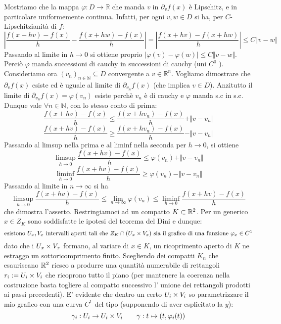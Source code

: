  Mostriamo che la mappa $\varphi: D \rightarrow \mathbb{R}$ che manda $v$ in $\partial_v f(x)$ è Lipschitz, e in particolare uniformemente continua. Infatti, per ogni $v,w \in D$ si ha, per $C$-Lipschitzianità di $f$:
$$  \left \vert \frac{ f(x+hv) - f(x) }{h} - \frac{ f(x+hw) - f(x) }{h} \right  \vert = \left \vert \frac{ f(x+hv) - f(x+hw)}{h} \right \vert \le C \Vert v-w \Vert $$ 
Passando al limite in $h \to 0 $ si ottiene proprio $\vert \varphi(v) - \varphi(w) \vert \le C \Vert v-w \Vert$. Perciò $\varphi$ manda successioni di cauchy in successioni di cauchy (uni $C^0$ ). \newline
Consideriamo ora $(v_n)_{n \in \mathbb{N} } \subseteq D$ convergente a $v \in \mathbb{R}^n$. Vogliamo dimostrare che $\partial_v f (x)$ esiste ed è uguale al limite di $\partial_{v_n} f (x) $ (che implica $v \in D$). Anzitutto il limite di $\partial_{v_n} f(x) = \varphi(v_n) $ esiste perchè $v_n$ è di cauchy e $\varphi$ manda s.c in s.c. Dunque vale $\forall n \in \mathbb{N}$, con lo stesso conto di prima:
$$ \frac{f(x+hv) - f(x) }{h}    \le \frac{ f(x+hv_n) - f(x) }{h} + \Vert v-v_n \Vert $$
$$ \frac{f(x+hv) - f(x)}{h} \ge \frac{ f(x+hv_n) - f(x) }{h} - \Vert v-v_n \Vert $$
Passando al limsup nella prima e al liminf nella seconda per $h \to 0$, si ottiene
$$\limsup_{h \to 0} \frac{f(x+hv) - f(x)}{h} \le \varphi(v_n) + \Vert v- v_n \Vert $$
$$ \liminf_{h \to 0} \frac{f(x+hv) - f(x)}{h} \ge \varphi(v_n) - \Vert v-v_n \Vert $$
Passando al limite in $n \to \infty$ si ha
$$ \limsup_{h \to 0} \frac{f(x+hv) - f(x)}{h} \le \lim_{n \to \infty} \varphi(v_n) \le \liminf_{h \to 0} \frac{f(x+hv) - f(x)}{h} $$
che dimostra l'asserto. 
 Restringiamoci ad un compatto $K\subset \mathbb{R}^2$. Per un generico $x\in Z_K$ sono soddisfatte le ipotesi del teorema del Dini e dunque:
$$
\mbox{esistono } U_x,V_x\mbox{ intervalli aperti tali che } Z_K\cap (U_x \times V_x) \mbox{ sia il grafico di una funzione $\varphi_x \in C^1$}
$$
dato che i $U_x \times V_x$ formano, al variare di $x\in K$, un ricoprimento aperto di $K$ ne estraggo un sottoricomprimento finito. Scegliendo dei compatti $K_n$ che esauriscano $\mathbb{R}^2$ riesco a produrre una quantità numerabile di rettangoli $r_i:=U_i \times V_i$ che ricoprono tutto il piano (per mantenere la coerenza nella costruzione basta togliere al compatto successivo l' unione dei rettangoli prodotti ai passi precedenti). E' evidente che dentro un certo $U_i \times V_i$ so parametrizzare il mio grafico con una curva $C^1$ del tipo (supponendo di aver esplicitato la $y$):
$$
\gamma_i:U_i \rightarrow U_i \times V_i \qquad \gamma: t\mapsto (t,\varphi_i(t))
$$
